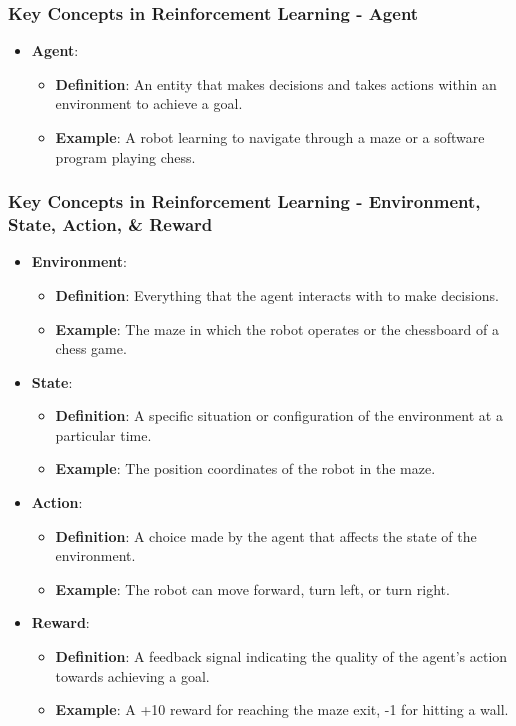 \documentclass[aspectratio=169]{beamer}
\begin{document}
\begin{frame}[fragile]
    \frametitle{Key Concepts in Reinforcement Learning - Agent}
    \begin{itemize}
        \item \textbf{Agent}:
        \begin{itemize}
            \item \textbf{Definition}: An entity that makes decisions and takes actions within an environment to achieve a goal.
            \item \textbf{Example}: A robot learning to navigate through a maze or a software program playing chess.
        \end{itemize}
    \end{itemize}
\end{frame}

\begin{frame}[fragile]
    \frametitle{Key Concepts in Reinforcement Learning - Environment, State, Action, & Reward}
    \begin{itemize}
        \item \textbf{Environment}:
        \begin{itemize}
            \item \textbf{Definition}: Everything that the agent interacts with to make decisions.
            \item \textbf{Example}: The maze in which the robot operates or the chessboard of a chess game.
        \end{itemize}
        
        \item \textbf{State}:
        \begin{itemize}
            \item \textbf{Definition}: A specific situation or configuration of the environment at a particular time.
            \item \textbf{Example}: The position coordinates of the robot in the maze.
        \end{itemize}
        
        \item \textbf{Action}:
        \begin{itemize}
            \item \textbf{Definition}: A choice made by the agent that affects the state of the environment.
            \item \textbf{Example}: The robot can move forward, turn left, or turn right.
        \end{itemize}

        \item \textbf{Reward}:
        \begin{itemize}
            \item \textbf{Definition}: A feedback signal indicating the quality of the agent's action towards achieving a goal.
            \item \textbf{Example}: A +10 reward for reaching the maze exit, -1 for hitting a wall.
        \end{itemize}
    \end{itemize}
\end{frame}
\end{document}
